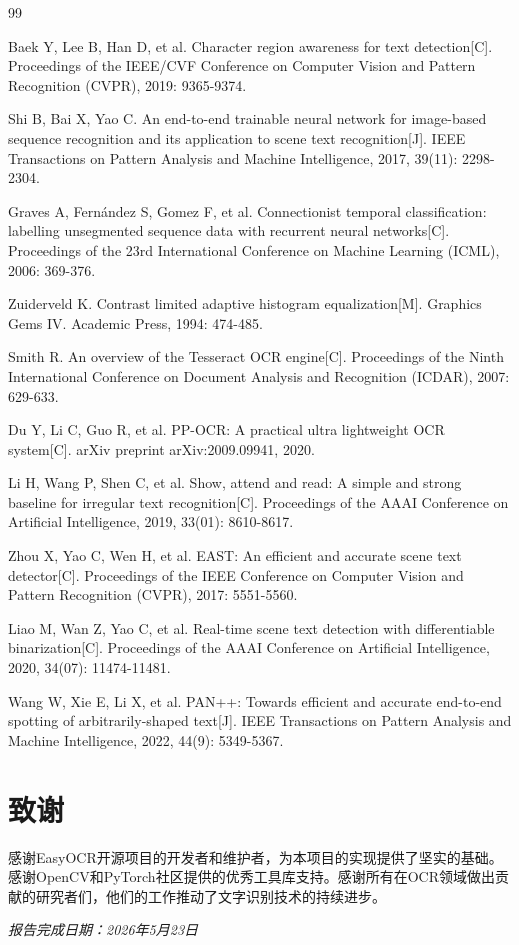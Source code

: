 \documentclass[12pt,hyperref,a4paper,UTF8]{ctexart}
\begin{document}
\clearpage

\begin{thebibliography}{99}

 Baek Y, Lee B, Han D, et al. Character region awareness for text detection[C]. Proceedings of the IEEE/CVF Conference on Computer Vision and Pattern Recognition (CVPR), 2019: 9365-9374.

 Shi B, Bai X, Yao C. An end-to-end trainable neural network for image-based sequence recognition and its application to scene text recognition[J]. IEEE Transactions on Pattern Analysis and Machine Intelligence, 2017, 39(11): 2298-2304.

 Graves A, Fernández S, Gomez F, et al. Connectionist temporal classification: labelling unsegmented sequence data with recurrent neural networks[C]. Proceedings of the 23rd International Conference on Machine Learning (ICML), 2006: 369-376.

 Zuiderveld K. Contrast limited adaptive histogram equalization[M]. Graphics Gems IV. Academic Press, 1994: 474-485.

 Smith R. An overview of the Tesseract OCR engine[C]. Proceedings of the Ninth International Conference on Document Analysis and Recognition (ICDAR), 2007: 629-633.

 Du Y, Li C, Guo R, et al. PP-OCR: A practical ultra lightweight OCR system[C]. arXiv preprint arXiv:2009.09941, 2020.

 Li H, Wang P, Shen C, et al. Show, attend and read: A simple and strong baseline for irregular text recognition[C]. Proceedings of the AAAI Conference on Artificial Intelligence, 2019, 33(01): 8610-8617.

 Zhou X, Yao C, Wen H, et al. EAST: An efficient and accurate scene text detector[C]. Proceedings of the IEEE Conference on Computer Vision and Pattern Recognition (CVPR), 2017: 5551-5560.

 Liao M, Wan Z, Yao C, et al. Real-time scene text detection with differentiable binarization[C]. Proceedings of the AAAI Conference on Artificial Intelligence, 2020, 34(07): 11474-11481.

 Wang W, Xie E, Li X, et al. PAN++: Towards efficient and accurate end-to-end spotting of arbitrarily-shaped text[J]. IEEE Transactions on Pattern Analysis and Machine Intelligence, 2022, 44(9): 5349-5367.

\end{thebibliography}

\vspace{2em}

\section*{致谢}

感谢EasyOCR开源项目的开发者和维护者，为本项目的实现提供了坚实的基础。感谢OpenCV和PyTorch社区提供的优秀工具库支持。感谢所有在OCR领域做出贡献的研究者们，他们的工作推动了文字识别技术的持续进步。

\vspace{2em}
\begin{flushright}
\textit{报告完成日期：2026年5月23日}
\end{flushright}
\end{document}
